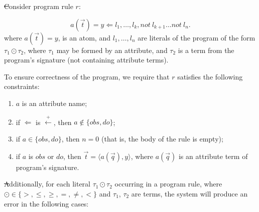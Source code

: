 \documentclass[12pt, letterpaper]{article}
\begin{document}
\st
Consider  program rule $r$:
  
\begin{equation}
   a(\vec{t}) = y \Leftarrow l_1,  \ldots, l_k, not~l_{k+1} \ldots not~l_{n}.
\end{equation}
where $a(\vec{t}) = y$, is an atom, and  $l_1,\ldots,l_n$ are literals of the program of the form $\tau_1 \odot \tau_2$,
where $\tau_1$ may be formed by an attribute, and $\tau_2$ is a term from the program's signature (not containing attribute terms).


\medskip\noindent
To ensure correctness of the program, we require that $r$ satisfies the following constraints:
\begin{enumerate}[label=(\arabic*),itemsep=5pt]
\item $a$ is an attribute name;
\item if $\Leftarrow$ is $\stackrel{+}{\leftarrow}$, then $a \not\in \{obs,do\}$;
\item if $a\in \{obs, do\}$, then $n=0$ (that is, the body of the rule is empty);
\item if $a$ is $obs$ or $do$, then $\vec{t} = \langle a(\vec{q}),y \rangle$, where $a(\vec{q})$ is an attribute term of program's signature.
\end{enumerate}

\st
Additionally, for each literal $\tau_1 \odot \tau_2$ occurring in a program rule, where $\odot \in \{>, \leq, \geq, =, \not=, <\}$ and $\tau_1$, $\tau_2$ are terms, the system will produce an error in the following cases:
\end{document}
